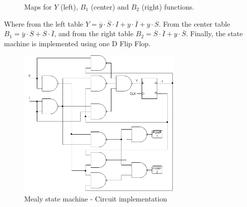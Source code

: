 \begin{figure}[H]
\begin{center}
     \begin{Karnaughvuit}
     \end{Karnaughvuit}
     \begin{Karnaughvuit}
     \end{Karnaughvuit}
     \begin{Karnaughvuit}
     \end{Karnaughvuit}
     \caption{Maps for $Y$ (left), $B_1$ (center) and $B_2$ (right) functions.}
\end{center}
\end{figure}
Where from the left table $Y = \overline{y} \cdot \overline{S} \cdot I + y \cdot \overline{I} + y \cdot S$. 
From the center table $B_1 = \overline{y} \cdot \overline{S} + \overline{S} \cdot \overline{I}$, and from the 
right table $B_2 = \overline{S} \cdot \overline{I} + y \cdot \overline{S}$.
Finally, the state machine is implemented using
one D Flip Flop.

\begin{figure}[H]
    \begin{centering}
    \includegraphics[width=0.7\textwidth]{data/Graficos1/1b_Compuertas_Mealy.png}
    \par\end{centering}
    \caption{Mealy state machine - Circuit implementation}
\end{figure}

